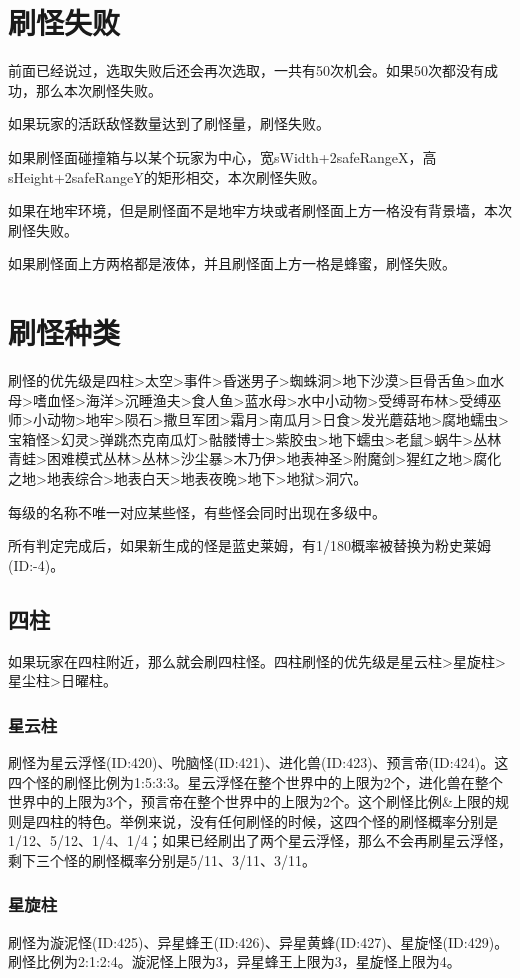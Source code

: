 \section{刷怪失败}
前面已经说过，选取失败后还会再次选取，一共有50次机会。如果50次都没有成功，那么本次刷怪失败。

如果玩家的活跃敌怪数量达到了刷怪量，刷怪失败。

如果刷怪面碰撞箱与以某个玩家为中心，宽sWidth+2safeRangeX，高sHeight+2safeRangeY的矩形相交，本次刷怪失败。

如果在地牢环境，但是刷怪面不是地牢方块或者刷怪面上方一格没有背景墙，本次刷怪失败。

如果刷怪面上方两格都是液体，并且刷怪面上方一格是蜂蜜，刷怪失败。

\section{刷怪种类}
刷怪的优先级是四柱>太空>事件>昏迷男子>蜘蛛洞>地下沙漠>巨骨舌鱼>血水母>嗜血怪>海洋>沉睡渔夫>食人鱼>蓝水母>水中小动物>受缚哥布林>受缚巫师>小动物>地牢>陨石>撒旦军团>霜月>南瓜月>日食>发光蘑菇地>腐地蠕虫>宝箱怪>幻灵>弹跳杰克南瓜灯>骷髅博士>紫胶虫>地下蠕虫>老鼠>蜗牛>丛林青蛙>困难模式丛林>丛林>沙尘暴>木乃伊>地表神圣>附魔剑>猩红之地>腐化之地>地表综合>地表白天>地表夜晚>地下>地狱>洞穴。

每级的名称不唯一对应某些怪，有些怪会同时出现在多级中。

所有判定完成后，如果新生成的怪是蓝史莱姆，有1/180概率被替换为粉史莱姆(ID:-4)。

\subsection{四柱}
如果玩家在四柱附近，那么就会刷四柱怪。四柱刷怪的优先级是星云柱>星旋柱>星尘柱>日曜柱。

\subsubsection{星云柱}
刷怪为星云浮怪(ID:420)、吮脑怪(ID:421)、进化兽(ID:423)、预言帝(ID:424)。这四个怪的刷怪比例为1:5:3:3。星云浮怪在整个世界中的上限为2个，进化兽在整个世界中的上限为3个，预言帝在整个世界中的上限为2个。这个刷怪比例\&上限的规则是四柱的特色。举例来说，没有任何刷怪的时候，这四个怪的刷怪概率分别是1/12、5/12、1/4、1/4；如果已经刷出了两个星云浮怪，那么不会再刷星云浮怪，剩下三个怪的刷怪概率分别是5/11、3/11、3/11。

\subsubsection{星旋柱}
刷怪为漩泥怪(ID:425)、异星蜂王(ID:426)、异星黄蜂(ID:427)、星旋怪(ID:429)。刷怪比例为2:1:2:4。漩泥怪上限为3，异星蜂王上限为3，星旋怪上限为4。

